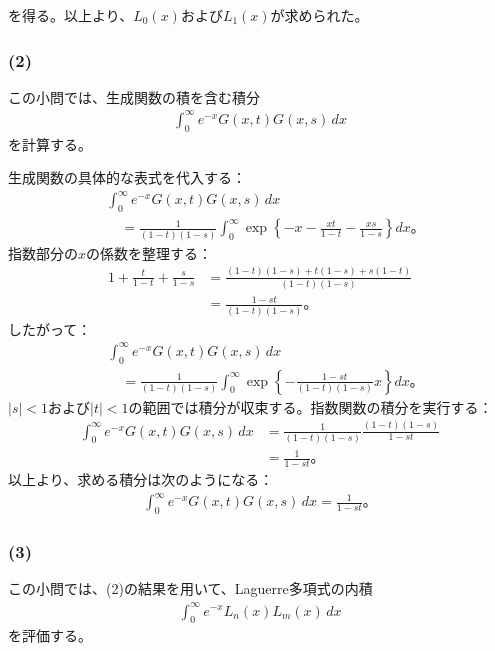 \documentclass[platex,dvipdfmx,a4paper]{jsarticle}
\begin{document}
  を得る。以上より、$L_0(x)$および$L_1(x)$が求められた。

  \subsubsection*{(2)}

  この小問では、生成関数の積を含む積分
  \begin{align*}
    \int_0^\infty e^{-x}G(x,t)G(x,s)\,dx
  \end{align*}
  を計算する。

  生成関数の具体的な表式を代入する：
  \begin{align*}
    &\int_0^\infty e^{-x}G(x,t)G(x,s)\,dx\\
    &\quad=
    \frac{1}{(1-t)(1-s)}
    \int_0^\infty
    \exp\left\{
      -x-\frac{xt}{1-t}-\frac{xs}{1-s}
    \right\}dx。
  \end{align*}
  指数部分の$x$の係数を整理する：
  \begin{align*}
    1+\frac{t}{1-t}+\frac{s}{1-s}
    &=
    \frac{(1-t)(1-s)+t(1-s)+s(1-t)}
    {(1-t)(1-s)}\\
    &=
    \frac{1-st}{(1-t)(1-s)}。
  \end{align*}
  したがって：
  \begin{align*}
    &\int_0^\infty e^{-x}G(x,t)G(x,s)\,dx\\
    &\quad=
    \frac{1}{(1-t)(1-s)}
    \int_0^\infty
    \exp\left\{
      -\frac{1-st}{(1-t)(1-s)}x
    \right\}dx。
  \end{align*}
  $|s|<1$および$|t|<1$の範囲では積分が収束する。指数関数の積分を実行する：
  \begin{align*}
    \int_0^\infty e^{-x}G(x,t)G(x,s)\,dx
    &=
    \frac{1}{(1-t)(1-s)}
    \frac{(1-t)(1-s)}{1-st}\\
    &=
    \frac{1}{1-st}。
  \end{align*}
  以上より、求める積分は次のようになる：
  \begin{align*}
    \int_0^\infty e^{-x}G(x,t)G(x,s)\,dx
    =\frac{1}{1-st}。
  \end{align*}

  \subsubsection*{(3)}

  この小問では、(2)の結果を用いて、Laguerre多項式の内積
  \begin{align*}
    \int_0^\infty e^{-x}L_n(x)L_m(x)\,dx
  \end{align*}
  を評価する。
\end{document}
